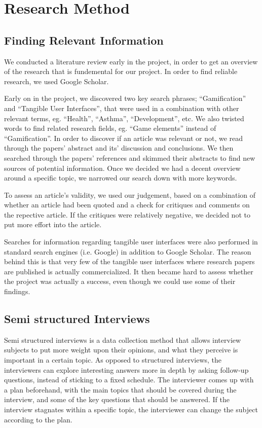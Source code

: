 \chapter{Research Method}
\label{sec:researchmethod}

\section{Finding Relevant Information}
\label{sec:literaturestudy}

We conducted a literature review early in the project, in order to get an overview of the research that is fundemental for our project. In order to find reliable research, we used Google Scholar. 

Early on in the project, we discovered two key search phrases; ``Gamification'' and ``Tangible User Interfaces'', that were used in a combination with other relevant terms, eg. ``Health'', ``Asthma'', ``Development'', etc. We also twisted words to find related research fields, eg. ``Game elements'' instead of ``Gamification''. 
In order to discover if an article was relevant or not, we read through the papers' abstract and its' discussion and conclusions. We then searched through the papers' references and skimmed their abstracts to find new sources of potential information. Once we decided we had a decent overview around a specific topic, we narrowed our search down with more keywords.

To assess an article's validity, we used our judgement, based on a combination of whether an article had been quoted and a check for critiques and comments on the repective article. If the critiques were relatively negative, we decided not to put more effort into the article. 

Searches for information regarding tangible user interfaces were also performed in standard search engines (i.e. Google) in addition to Google Scholar. The reason behind this is that very few of the tangible user interfaces where research papers are published is actually commercialized. It then became hard to assess whether the project was actually a success, even though we could use some of their findings.      
 
\section{Semi structured Interviews}
\label{sec:semistructuredinterviews}

Semi structured interviews is a data collection method that allows interview subjects to put more weight upon their opinions, and what they perceive is important in a certain topic. As opposed to structured interviews, the interviewers can explore interesting answers more in depth by asking follow-up questions, instead of sticking to a fixed schedule. The interviewer comes up with a plan beforehand, with the main topics that should be covered during the interview, and some of the key questions that should be answered. If the interview stagnates within a specific topic, the interviewer can change the subject according to the plan.

